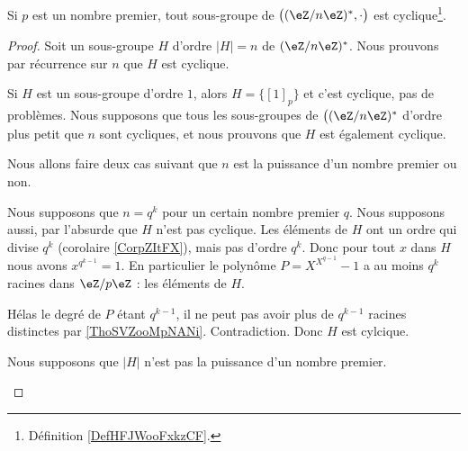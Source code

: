 \begin{proposition}       \label{PROPooKSCRooPyInSv}
	Si \( p\) est un nombre premier, tout sous-groupe de \( \big( (\eZ/n\eZ)^*, \cdot\big)\) est cyclique\footnote{Définition \ref{DefHFJWooFxkzCF}.}.
\end{proposition}

\begin{proof}
	Soit un sous-groupe \( H\) d'ordre \( | H |=n\) de \(   (\eZ/n\eZ)^*\). Nous prouvons par récurrence sur \( n\) que \( H\) est cyclique.

	\begin{subproof}
		\spitem[\( n=1\)]
		Si \( H\) est un sous-groupe d'ordre \( 1\), alors \( H=\{ [1]_p \}\) et c'est cyclique, pas de problèmes.
		\spitem[Récurrence]
		Nous supposons que tous les sous-groupes de \( \big( (\eZ/n\eZ)^*\) d'ordre plus petit que \( n\) sont cycliques, et nous prouvons que \( H\) est également cyclique.

		Nous allons faire deux cas suivant que \( n\) est la puissance d'un nombre premier ou non.

		\begin{subproof}
			\spitem[Si \( n=q^k\)]
			Nous supposons que \( n=q^k\) pour un certain nombre premier \( q\). Nous supposons aussi, par l'absurde que \( H\) n'est pas cyclique. Les éléments de \( H\) ont un ordre qui divise \( q^k\) (corolaire \ref{CorpZItFX}), mais pas d'ordre \( q^k\). Donc pour tout \( x\) dans \( H\) nous avons \( x^{q^{k-1}}=1\). En particulier le polynôme \( P=X^{X^{q-1}}-1\) a au moins \( q^k\) racines dans \( \eZ/p\eZ\) : les éléments de \( H\).

			Hélas le degré de \( P\) étant \( q^{k-1}\), il ne peut pas avoir plus de \( q^{k-1}\) racines distinctes par \ref{ThoSVZooMpNANi}. Contradiction. Donc \( H\) est cylcique.


			Nous supposons que \( | H |\) n'est pas la puissance d'un nombre premier.


\end{subproof}
\end{subproof}
\end{proof}

